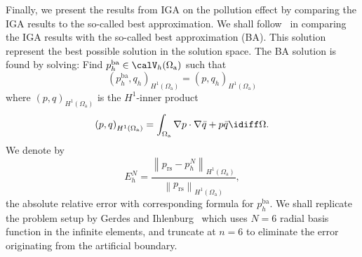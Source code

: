 Finally, we present the results from IGA on the pollution effect by comparing the IGA results to the so-called best approximation. We shall follow~\cite{Gerdes1999otp} in comparing the IGA results with the so-called best approximation (BA). This solution represent the best possible solution in the solution space. The BA solution is found by solving: Find $p_h^{\mathrm{ba}}\in \calV_h(\Omega_{\mathrm{a}})$ such that
\begin{equation*}
	\left(p_h^{\mathrm{ba}},q_h\right)_{H^1(\Omega_{\mathrm{a}})} = \left(p, q_h\right)_{H^1(\Omega_{\mathrm{a}})}
\end{equation*}
where $\left(p,q\right)_{H^1(\Omega_{\mathrm{a}})}$ is the $H^1$-inner product
\begin{equation*}
	\left(p,q\right)_{H^1(\Omega_{\mathrm{a}})} = \int_{\Omega_{\mathrm{a}}}\nabla p\cdot\nabla \bar{q} + p \bar{q}\idiff\Omega.
\end{equation*}
We denote by
\begin{equation}\label{Eq2:H1relError}
	E_h^N = \frac{\left\|p_{\mathrm{rs}}-p_h^N\right\|_{H^1(\Omega_{\mathrm{a}})}}{\left\|p_{\mathrm{rs}}\right\|_{H^1(\Omega_{\mathrm{a}})}},
\end{equation}
the absolute relative error with corresponding formula for $p_h^{\mathrm{ba}}$. We shall replicate the problem setup by Gerdes and Ihlenburg~\cite{Gerdes1999otp} which uses $N=6$ radial basis function in the infinite elements, and truncate  at $n=6$ to eliminate the error originating from the artificial boundary.


